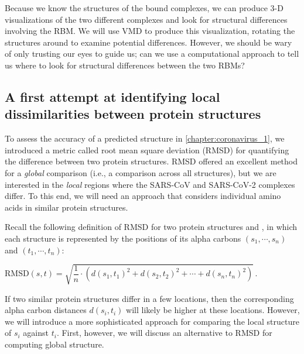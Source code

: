Because we know the structures of the bound complexes, we can produce 3-D visualizations of the two different complexes and look for structural differences involving the RBM. We will use VMD to produce this visualization, rotating the structures around to examine potential differences. However, we should be wary of only trusting our eyes to guide us; can we use a computational approach to tell us where to look for structural differences between the two RBMs?

\FloatBarrier
{}
\subsection{A first attempt at identifying local dissimilarities between protein structures}

To assess the accuracy of a predicted structure in \autoref{chapter:coronavirus_1}, we introduced a metric called root mean square deviation (RMSD) for quantifying the difference between two protein structures. RMSD offered an excellent method for a \textit{global} comparison (i.e., a comparison across all structures), but we are interested in the \textit{local} regions where the SARS-CoV and SARS-CoV-2 complexes differ. To this end, we will need an approach that considers individual amino acids in similar protein structures.\\

\begin{qbox}\end{qbox}

Recall the following definition of RMSD for two protein structures  and , in which each structure is represented by the positions of its  alpha carbons $(s_{1}, \cdots, s_{n})$ and $(t_{1}, \cdots, t_{n})$:

\begin{center}
$\text{RMSD}(s, t) = \sqrt{\dfrac{1}{n} \cdot (d(s_1, t_1)^2 + d(s_2, t_2)^2 + \cdots + d(s_n, t_n)^2)}$\,.
\end{center}

\noindent If two similar protein structures differ in a few locations, then the corresponding alpha carbon distances $d(s_{i}, t_{i})$ will likely be higher at these locations. However, we will introduce a more sophisticated approach for
comparing the local structure of $s_{i}$ against $t_{i}$. First, however, we will discuss an alternative to RMSD for computing global structure.

